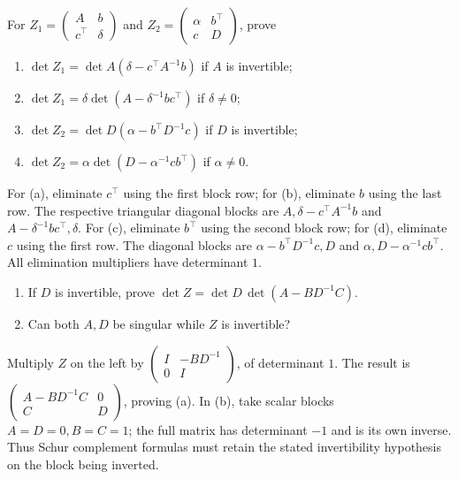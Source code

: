 \begin{problem}\label{ex:07:block-scalar}
For \(Z_1=\begin{pmatrix}A&b\\c^\top&\delta\end{pmatrix}\) and
\(Z_2=\begin{pmatrix}\alpha&b^\top\\c&D\end{pmatrix}\), prove
\begin{enumerate}
\item \(\det Z_1=\det A(\delta-c^\top A^{-1}b)\) if \(A\) is invertible;
\item \(\det Z_1=\delta\det(A-\delta^{-1}bc^\top)\) if \(\delta\ne0\);
\item \(\det Z_2=\det D(\alpha-b^\top D^{-1}c)\) if \(D\) is invertible;
\item \(\det Z_2=\alpha\det(D-\alpha^{-1}cb^\top)\) if \(\alpha\ne0\).
\end{enumerate}
\end{problem}
\begin{solution}
For (a), eliminate \(c^\top\) using the first block row; for (b),
eliminate \(b\) using the last row. The respective triangular diagonal
blocks are \(A,\delta-c^\top A^{-1}b\) and
\(A-\delta^{-1}bc^\top,\delta\).
For (c), eliminate \(b^\top\) using the second block row; for (d),
eliminate \(c\) using the first row. The diagonal blocks are
\(\alpha-b^\top D^{-1}c,D\) and \(\alpha,D-\alpha^{-1}cb^\top\).
All elimination multipliers have determinant \(1\).
\end{solution}

\begin{problem}\label{ex:07:schur}
\begin{enumerate}
\item If \(D\) is invertible, prove
\(\det Z=\det D\,\det(A-BD^{-1}C)\).
\item Can both \(A,D\) be singular while \(Z\) is invertible?
\end{enumerate}
\end{problem}
\begin{solution}
Multiply \(Z\) on the left by
\(\begin{pmatrix}I&-BD^{-1}\\0&I\end{pmatrix}\), of determinant \(1\).
The result is \(\begin{pmatrix}A-BD^{-1}C&0\\C&D\end{pmatrix}\),
proving (a). In (b), take scalar blocks \(A=D=0,B=C=1\);
the full matrix has determinant \(-1\) and is its own inverse.
Thus Schur complement formulas must retain the stated invertibility
hypothesis on the block being inverted.
\end{solution}

